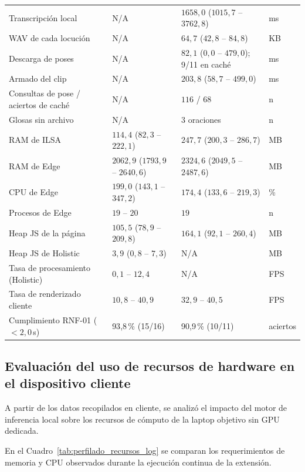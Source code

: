 \begin{table}[H]
\begin{tabularx}{\textwidth}{l X X X}
Transcripción local & N/A & $1658{,}0$ ($1015{,}7$ -- $3762{,}8$) & ms \\
WAV de cada locución & N/A & $64{,}7$ ($42{,}8$ -- $84{,}8$) & KB \\
Descarga de poses & N/A & $82{,}1$ ($0{,}0$ -- $479{,}0$); 9/11 en caché & ms \\
Armado del clip & N/A & $203{,}8$ ($58{,}7$ -- $499{,}0$) & ms \\
Consultas de pose / aciertos de caché & N/A & $116$ / $68$ & n \\
Glosas sin archivo & N/A & 3 oraciones & n \\
RAM de ILSA & $114{,}4$ ($82{,}3$ -- $222{,}1$) & $247{,}7$ ($200{,}3$ -- $286{,}7$) & MB \\
RAM de Edge & $2062{,}9$ ($1793{,}9$ -- $2640{,}6$) & $2324{,}6$ ($2049{,}5$ -- $2487{,}6$) & MB \\
CPU de Edge & $199{,}0$ ($143{,}1$ -- $347{,}2$) & $174{,}4$ ($133{,}6$ -- $219{,}3$) & \% \\
Procesos de Edge & $19$ -- $20$ & $19$ & n \\
Heap JS de la página & $105{,}5$ ($78{,}9$ -- $209{,}8$) & $164{,}1$ ($92{,}1$ -- $260{,}4$) & MB \\
Heap JS de Holistic & $3{,}9$ ($0{,}8$ -- $7{,}3$) & N/A & MB \\
Tasa de procesamiento (Holistic) & $0{,}1$ -- $12{,}4$ & N/A & FPS \\
Tasa de renderizado cliente & $10{,}8$ -- $40{,}9$ & $32{,}9$ -- $40{,}5$ & FPS \\
Cumplimiento RNF-01 ($< 2{,}0$\,s) & 93{,}8\,\% (15/16) & 90{,}9\,\% (10/11) & aciertos \\
\bottomrule
\end{tabularx}
\end{table}

\subsection{Evaluación del uso de recursos de hardware en el dispositivo cliente}
\label{sec:perfilado_cliente_recursos}

A partir de los datos recopilados en cliente, se analizó el impacto del motor de inferencia local sobre los recursos de cómputo de la laptop objetivo sin GPU dedicada.

En el Cuadro~\ref{tab:perfilado_recursos_log} se comparan los requerimientos de memoria y CPU observados durante la ejecución continua de la extensión.

